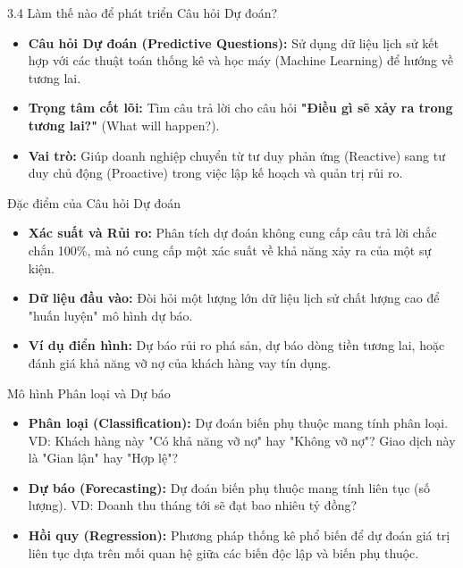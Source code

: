 \documentclass[aspectratio=169,12pt]{beamer}
\begin{document}
\begin{frame}{3.4 Làm thế nào để phát triển Câu hỏi Dự đoán?}
\begin{itemize}
    \item \textbf{Câu hỏi Dự đoán (Predictive Questions):} Sử dụng dữ liệu lịch sử kết hợp với các thuật toán thống kê và học máy (Machine Learning) để hướng về tương lai.
    \item \textbf{Trọng tâm cốt lõi:} Tìm câu trả lời cho câu hỏi \textbf{"Điều gì sẽ xảy ra trong tương lai?"} (What will happen?).
    \item \textbf{Vai trò:} Giúp doanh nghiệp chuyển từ tư duy phản ứng (Reactive) sang tư duy chủ động (Proactive) trong việc lập kế hoạch và quản trị rủi ro.
\end{itemize}
\end{frame}

\begin{frame}{Đặc điểm của Câu hỏi Dự đoán}
\begin{itemize}
    \item \textbf{Xác suất và Rủi ro:} Phân tích dự đoán không cung cấp câu trả lời chắc chắn 100\%, mà nó cung cấp một xác suất về khả năng xảy ra của một sự kiện.
    \item \textbf{Dữ liệu đầu vào:} Đòi hỏi một lượng lớn dữ liệu lịch sử chất lượng cao để "huấn luyện" mô hình dự báo.
    \item \textbf{Ví dụ điển hình:} Dự báo rủi ro phá sản, dự báo dòng tiền tương lai, hoặc đánh giá khả năng vỡ nợ của khách hàng vay tín dụng.
\end{itemize}
\end{frame}

\begin{frame}{Mô hình Phân loại và Dự báo}
\begin{itemize}
    \item \textbf{Phân loại (Classification):} Dự đoán biến phụ thuộc mang tính phân loại. VD: Khách hàng này "Có khả năng vỡ nợ" hay "Không vỡ nợ"? Giao dịch này là "Gian lận" hay "Hợp lệ"?
    \item \textbf{Dự báo (Forecasting):} Dự đoán biến phụ thuộc mang tính liên tục (số lượng). VD: Doanh thu tháng tới sẽ đạt bao nhiêu tỷ đồng?
    \item \textbf{Hồi quy (Regression):} Phương pháp thống kê phổ biến để dự đoán giá trị liên tục dựa trên mối quan hệ giữa các biến độc lập và biến phụ thuộc.
\end{itemize}
\end{frame}
\end{document}
